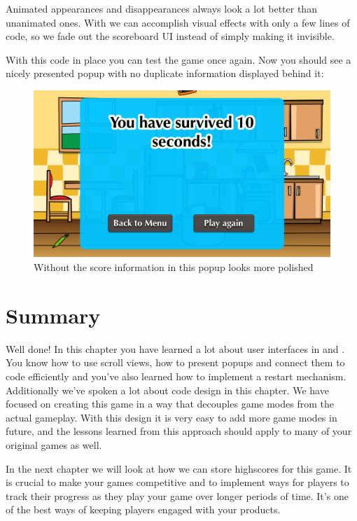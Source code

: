Animated appearances and disappearances always look a lot better than unanimated
ones. With \cocos{} we can accomplish visual effects with only a few lines of
code, so we fade out the scoreboard UI instead of simply making it invisible.

With this code in place you can test the game once again. Now you should see a
nicely presented popup with no duplicate information displayed behind it:

\begin{figure}[H]
    \centering
    \includegraphics[width=0.75\linewidth]{images/Chapter7/ui_fadeout_popup.png}
    \caption{Without the score information in  this popup
    looks more polished}
\end{figure}

\section{Summary}

Well done! In this chapter you have learned a lot about user interfaces in \SB{}
and \cocos{}. You know how to use scroll views, how to present popups and
connect them to code efficiently and you've also learned how to implement a
restart mechanism. Additionally we've spoken a lot about code design in this
chapter. We have focused on creating this game in a way that decouples game
modes from the actual gameplay. With this design it is very easy to add more
game modes in future, and the lessons learned from this approach should apply to
many of your original games as well.

In the next chapter we will look at how we can store highscores for this game.
It is crucial to make your games competitive and to implement ways for players
to track their progress as they play your game over longer periods of time. It's
one of the best ways of keeping players engaged with your products.